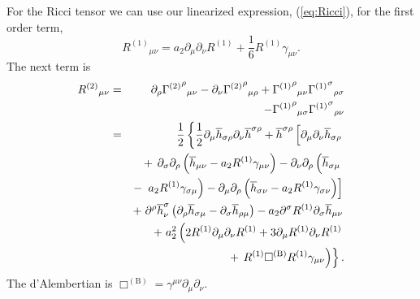 \documentclass[aps,prd,amsfonts,amssymb,amsmath,nofootinbib,reprint,showpacs]{revtex4-1}
\newcommand{\eqnref}[1]{(\ref{eq:#1})}
\newcommand{\recip}[1]{\ensuremath{\frac{1}{#1}}}
\begin{document}
For the Ricci tensor we can use our linearized expression, \eqnref{Ricci}, for the first order term,
\begin{equation}
{R^{(1)}}_{\mu\nu} = a_2\partial_\mu\partial_\nu R^{(1)} + \recip{6} R^{(1)}\gamma_{\mu\nu}.
\end{equation}
The next term is
\begin{eqnarray}
{R^{(2)}}_{\mu\nu} & = & \partial_\rho {{\Gamma^{(2)}}^\rho}_{\mu\nu} - \partial_\nu {{\Gamma^{(2)}}^\rho}_{\mu\rho} + {{\Gamma^{(1)}}^\rho}_{\mu\nu}{{\Gamma^{(1)}}^\sigma}_{\rho\sigma} \nonumber \\* 
 & & - {} {{\Gamma^{(1)}}^\rho}_{\mu\sigma}{{\Gamma^{(1)}}^\sigma}_{\rho\nu} \nonumber \\
 & = & \frac{1}{2}\left\{\recip{2}\partial_\mu\overline{h}_{\sigma\rho}\partial_\nu\overline{h}^{\sigma\rho} + \overline{h}^{\sigma\rho}\left[\partial_\mu\partial_\nu\overline{h}_{\sigma\rho} \vphantom{R^{(1)}} \right.\right. \nonumber \\*
 & & + \left.\left. \partial_\sigma\partial_\rho\left(\overline{h}_{\mu\nu} - a_2 R^{(1)}\gamma_{\mu\nu}\right) - \partial_\nu\partial_\rho\left(\overline{h}_{\sigma\mu} \vphantom{R^{(1)}} \right.\right.\right. \nonumber \\*
 & & - \left.\left.\left. a_2 R^{(1)} \gamma_{\sigma\mu}\right) - \partial_\mu\partial_\rho\left(\overline{h}_{\sigma\nu} - a_2 R^{(1)} \gamma_{\sigma\nu}\right)\right] \right. \nonumber \\*
 & & + \left. \partial^\rho\overline{h}^\sigma_\nu\left(\partial_\rho\overline{h}_{\sigma\mu} - \partial_\sigma\overline{h}_{\rho\mu}\right) - a_2 \partial^\sigma R^{(1)}\partial_\sigma\overline{h}_{\mu\nu} \right. \nonumber \\*
 & & + \left. a_2^2 \left(2R^{(1)}\partial_\mu\partial_\nu R^{(1)} + 3\partial_\mu R^{(1)}\partial_\nu R^{(1)} \right.\right. \nonumber \\*
 & & + \left.\left. R^{(1)} \Box^{(\text{B})} R^{(1)} \gamma_{\mu\nu}\right)\right\}.
\end{eqnarray}
The d'Alembertian is $\Box^{(\text{B})} = \gamma^{\mu\nu}\partial_\mu\partial_\nu$.
\end{document}
